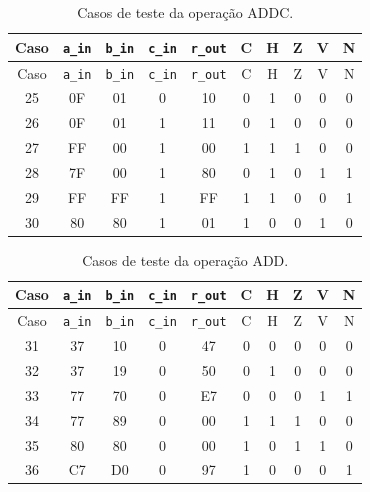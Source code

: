 \begin{longtable}{c c c c c c c c c c}
\caption{Casos de teste da operação ADDC.}
\label{tab:testes-ADDC}\\
\hline
Caso & \texttt{a\_in} & \texttt{b\_in} & \texttt{c\_in} & \texttt{r\_out} & C & H & Z & V & N \\ \hline
\endfirsthead
\hline
Caso & \texttt{a\_in} & \texttt{b\_in} & \texttt{c\_in} & \texttt{r\_out} & C & H & Z & V & N \\ \hline
\endhead
25 & 0F & 01 & 0 & 10 & 0 & 1 & 0 & 0 & 0 \\
26 & 0F & 01 & 1 & 11 & 0 & 1 & 0 & 0 & 0 \\
27 & FF & 00 & 1 & 00 & 1 & 1 & 1 & 0 & 0 \\
28 & 7F & 00 & 1 & 80 & 0 & 1 & 0 & 1 & 1 \\
29 & FF & FF & 1 & FF & 1 & 1 & 0 & 0 & 1 \\
30 & 80 & 80 & 1 & 01 & 1 & 0 & 0 & 1 & 0 \\
\hline
\end{longtable}
\vspace{-0.5cm}

\begin{longtable}{c c c c c c c c c c}
\caption{Casos de teste da operação ADD.}
\label{tab:testes-ADD}\\
\hline
Caso & \texttt{a\_in} & \texttt{b\_in} & \texttt{c\_in} & \texttt{r\_out} & C & H & Z & V & N \\ \hline
\endfirsthead
\hline
Caso & \texttt{a\_in} & \texttt{b\_in} & \texttt{c\_in} & \texttt{r\_out} & C & H & Z & V & N \\ \hline
\endhead
31 & 37 & 10 & 0 & 47 & 0 & 0 & 0 & 0 & 0 \\
32 & 37 & 19 & 0 & 50 & 0 & 1 & 0 & 0 & 0 \\
33 & 77 & 70 & 0 & E7 & 0 & 0 & 0 & 1 & 1 \\
34 & 77 & 89 & 0 & 00 & 1 & 1 & 1 & 0 & 0 \\
35 & 80 & 80 & 0 & 00 & 1 & 0 & 1 & 1 & 0 \\
36 & C7 & D0 & 0 & 97 & 1 & 0 & 0 & 0 & 1 \\
\hline
\end{longtable}
\vspace{-0.5cm}

